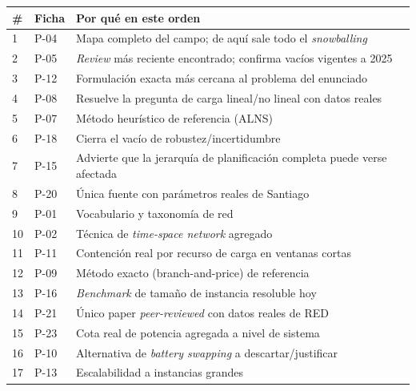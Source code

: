 \documentclass[11pt,a4paper,parskip=half]{scrartcl}
\begin{document}
\begin{longtable}{@{}p{0.7cm}p{6cm}p{8.5cm}@{}}
\toprule
\textbf{\#} & \textbf{Ficha} & \textbf{Por qué en este orden} \\
\midrule
\endhead
1 & P-04 \citet{perumal_evspreview_2022} & Mapa completo del campo; de aquí sale todo el \textit{snowballing} \\
2 & P-05 \citet{wang_bevretrospective_2025} & \textit{Review} más reciente encontrado; confirma vacíos vigentes a 2025 \\
3 & P-12 \citet{devos_capacitatedcharging_2024} & Formulación exacta más cercana al problema del enunciado \\
4 & P-08 \citet{vankootenniekerk_schedulingev_2017} & Resuelve la pregunta de carga lineal/no lineal con datos reales \\
5 & P-07 \citet{wen_alnsevsp_2016} & Método heurístico de referencia (ALNS) \\
6 & P-18 \citet{ricard_chanceconstrained_2026} & Cierra el vacío de robustez/incertidumbre \\
7 & P-15 \citet{hall_adjustmentsplanning_2018} & Advierte que la jerarquía de planificación completa puede verse afectada \\
8 & P-20 \citet{galarza_pilotstoscale_2020} & Única fuente con parámetros reales de Santiago \\
9 & P-01 \citet{bunte_vspoverview_2009} & Vocabulario y taxonomía de red \\
10 & P-02 \citet{kliewer_timespacemdvsp_2006} & Técnica de \textit{time-space network} agregado \\
11 & P-11 \citet{he_fastchargingbus_2020} & Contención real por recurso de carga en ventanas cortas \\
12 & P-09 \citet{adler_altfuelvsp_2017} & Método exacto (branch-and-price) de referencia \\
13 & P-16 \citet{wu_waitingtimebranchprice_2025} & \textit{Benchmark} de tamaño de instancia resoluble hoy \\
14 & P-21 \citet{basso_disaggregatedenergy_2024} & Único paper \textit{peer-reviewed} con datos reales de RED \\
15 & P-23 \citet{zapata_gridimpact_2022} & Cota real de potencia agregada a nivel de sistema \\
16 & P-10 \citet{li_limitedenergy_2014} & Alternativa de \textit{battery swapping} a descartar/justificar \\
17 & P-13 \citet{jiang_limitedcapacitylargescale_2022} & Escalabilidad a instancias grandes \\

\end{longtable}
\end{document}
